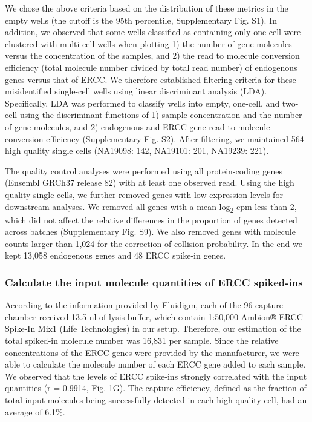 We chose the above criteria based on the distribution of these metrics
in the empty wells (the cutoff is the 95th percentile, Supplementary
Fig. S1). In addition, we observed that some wells classified as
containing only one cell were clustered with multi-cell wells when
plotting 1) the number of gene molecules versus the concentration of the
samples, and 2) the read to molecule conversion efficiency (total
molecule number divided by total read number) of endogenous genes versus
that of ERCC. We therefore established filtering criteria for these
misidentified single-cell wells using linear discriminant analysis
(LDA). Specifically, LDA was performed to classify wells into empty,
one-cell, and two-cell using the discriminant functions of 1) sample
concentration and the number of gene molecules, and 2) endogenous and
ERCC gene read to molecule conversion efficiency (Supplementary Fig.
S2). After filtering, we maintained 564 high quality single cells
(NA19098: 142, NA19101: 201, NA19239: 221).

The quality control analyses were performed using all protein-coding
genes (Ensembl GRCh37 release 82) with at least one observed read. Using
the high quality single cells, we further removed genes with low
expression levels for downstream analyses. We removed all genes with a
mean log\textsubscript{2} cpm less than 2, which did not affect the
relative differences in the proportion of genes detected across batches
(Supplementary Fig. S9). We also removed genes with molecule counts
larger than 1,024 for the correction of collision probability. In the
end we kept 13,058 endogenous genes and 48 ERCC spike-in genes.

\subsubsection{Calculate the input molecule quantities of ERCC
spiked-ins}\label{calculate-the-input-molecule-quantities-of-ercc-spiked-ins}

According to the information provided by Fluidigm, each of the 96
capture chamber received 13.5 nl of lysis buffer, which contain 1:50,000
Ambion® ERCC Spike-In Mix1 (Life Technologies) in our setup. Therefore,
our estimation of the total spiked-in molecule number was 16,831 per
sample. Since the relative concentrations of the ERCC genes were
provided by the manufacturer, we were able to calculate the molecule
number of each ERCC gene added to each sample. We observed that the
levels of ERCC spike-ins strongly correlated with the input quantities
(r = 0.9914, Fig. 1G). The capture efficiency, defined as the fraction
of total input molecules being successfully detected in each high
quality cell, had an average of 6.1\%.

